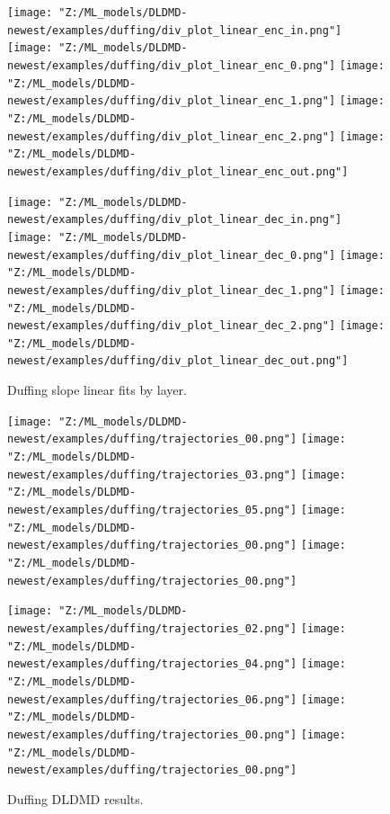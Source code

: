 \begin{figure}[!htbp]
    \centering
    \begin{minipage}{.5\textwidth}
        \texttt{[image: "Z:/ML\_models/DLDMD-newest/examples/duffing/div\_plot\_linear\_enc\_in.png"]} 
        \texttt{[image: "Z:/ML\_models/DLDMD-newest/examples/duffing/div\_plot\_linear\_enc\_0.png"]} 
        \texttt{[image: "Z:/ML\_models/DLDMD-newest/examples/duffing/div\_plot\_linear\_enc\_1.png"]} 
        \texttt{[image: "Z:/ML\_models/DLDMD-newest/examples/duffing/div\_plot\_linear\_enc\_2.png"]} 
        \texttt{[image: "Z:/ML\_models/DLDMD-newest/examples/duffing/div\_plot\_linear\_enc\_out.png"]} 
    \end{minipage}%
    \begin{minipage}{.5\textwidth}
        \texttt{[image: "Z:/ML\_models/DLDMD-newest/examples/duffing/div\_plot\_linear\_dec\_in.png"]} 
        \texttt{[image: "Z:/ML\_models/DLDMD-newest/examples/duffing/div\_plot\_linear\_dec\_0.png"]} 
        \texttt{[image: "Z:/ML\_models/DLDMD-newest/examples/duffing/div\_plot\_linear\_dec\_1.png"]} 
        \texttt{[image: "Z:/ML\_models/DLDMD-newest/examples/duffing/div\_plot\_linear\_dec\_2.png"]} 
        \texttt{[image: "Z:/ML\_models/DLDMD-newest/examples/duffing/div\_plot\_linear\_dec\_out.png"]} 
    \end{minipage}
    \caption{Duffing slope linear fits by layer.}
    \label{fig:duffing linear fits all layers}
\end{figure}

\begin{figure}[!htbp]
    \centering
    \begin{minipage}{.5\textwidth}
        \texttt{[image: "Z:/ML\_models/DLDMD-newest/examples/duffing/trajectories\_00.png"]} 
        \texttt{[image: "Z:/ML\_models/DLDMD-newest/examples/duffing/trajectories\_03.png"]} 
        \texttt{[image: "Z:/ML\_models/DLDMD-newest/examples/duffing/trajectories\_05.png"]} 
        \texttt{[image: "Z:/ML\_models/DLDMD-newest/examples/duffing/trajectories\_00.png"]} 
        \texttt{[image: "Z:/ML\_models/DLDMD-newest/examples/duffing/trajectories\_00.png"]} 
    \end{minipage}%
    \begin{minipage}{.5\textwidth}
        \texttt{[image: "Z:/ML\_models/DLDMD-newest/examples/duffing/trajectories\_02.png"]} 
        \texttt{[image: "Z:/ML\_models/DLDMD-newest/examples/duffing/trajectories\_04.png"]} 
        \texttt{[image: "Z:/ML\_models/DLDMD-newest/examples/duffing/trajectories\_06.png"]} 
        \texttt{[image: "Z:/ML\_models/DLDMD-newest/examples/duffing/trajectories\_00.png"]} 
        \texttt{[image: "Z:/ML\_models/DLDMD-newest/examples/duffing/trajectories\_00.png"]} 
    \end{minipage}
    \caption{Duffing DLDMD results.}
    \label{fig:duffing DLDMD results}
\end{figure}

